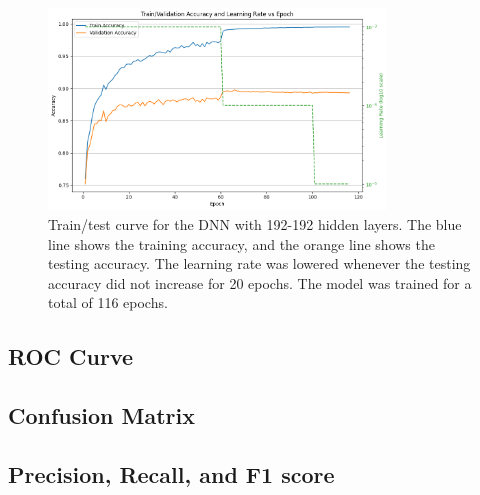 \documentclass[12pt]{article}
\begin{document}
\begin{figure}[H]
\centering
\includegraphics[width=0.8\textwidth]{figures/dnn_train_test_curve.png}
\caption{Train/test curve for the DNN with 192-192 hidden layers. The blue line shows the training accuracy, and the orange line shows the testing accuracy. The learning rate was lowered whenever the testing accuracy did not increase for 20 epochs. The model was trained for a total of 116 epochs.}
\label{fig:dnn_train_test_curve}
\end{figure}

\subsection{ROC Curve}
\noindent

\subsection{Confusion Matrix}
\noindent

\subsection{Precision, Recall, and F1 score}
\noindent
\end{document}
